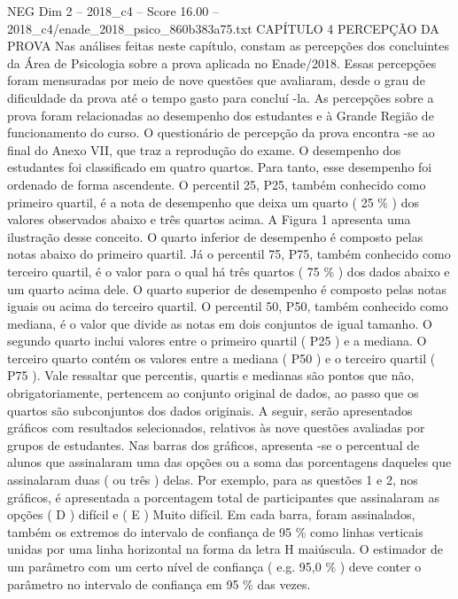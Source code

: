 \begin{textsample}{NEG Dim 2 – 2018\_c4 – Score 16.00 – 2018\_c4/enade\_2018\_psico\_860b383a75.txt}  \label{ex:f2_neg_383}
CAPÍTULO 4 PERCEPÇÃO DA PROVA Nas análises feitas neste capítulo, constam as percepções dos concluintes da Área de Psicologia sobre a prova aplicada no Enade/2018.
Essas percepções foram mensuradas por meio de nove questões que avaliaram, desde o grau de dificuldade da prova até o tempo gasto para concluí -la.
As percepções sobre a prova foram relacionadas ao desempenho dos estudantes e à Grande Região de funcionamento do curso.
O questionário de percepção da prova encontra -se ao final do Anexo VII, que traz a reprodução do exame.
O desempenho dos estudantes foi classificado em quatro quartos.
Para tanto, esse desempenho foi ordenado de forma ascendente.
O percentil 25, P25, também conhecido como primeiro quartil, é a nota de desempenho que deixa um quarto ( 25 \% ) dos valores observados abaixo e três quartos acima.
A Figura 1 apresenta uma ilustração desse conceito.
O quarto inferior de desempenho é composto pelas notas abaixo do primeiro quartil.
Já o percentil 75, P75, também conhecido como terceiro quartil, é o valor para o qual há três quartos ( 75 \% ) dos dados abaixo e um quarto acima dele.
O quarto superior de desempenho é composto pelas notas iguais ou acima do terceiro quartil.
O percentil 50, P50, também conhecido como mediana, é o valor que divide as notas em dois conjuntos de igual tamanho.
O segundo quarto inclui valores entre o primeiro quartil ( P25 ) e a mediana.
O terceiro quarto contém os valores entre a mediana ( P50 ) e o terceiro quartil ( P75 ).
Vale ressaltar que percentis, quartis e medianas são pontos que não, obrigatoriamente, pertencem ao conjunto original de dados, ao passo que os quartos são subconjuntos dos dados originais.
A seguir, serão apresentados gráficos com resultados selecionados, relativos às nove questões avaliadas por grupos de estudantes.
Nas barras dos gráficos, apresenta -se o percentual de alunos que assinalaram uma das opções ou a soma das porcentagens daqueles que assinalaram duas ( ou três ) delas.
Por exemplo, para as questões 1 e 2, nos gráficos, é apresentada a porcentagem total de participantes que assinalaram as opções ( D ) difícil e ( E ) Muito difícil.
Em cada barra, foram assinalados, também os extremos do intervalo de confiança de 95 \% como linhas verticais unidas por uma linha horizontal na forma da letra H maiúscula.
O estimador de um parâmetro com um certo nível de confiança ( e.g. 95,0 \% ) deve conter o parâmetro no intervalo de confiança em 95 \% das vezes.

\end{textsample}
